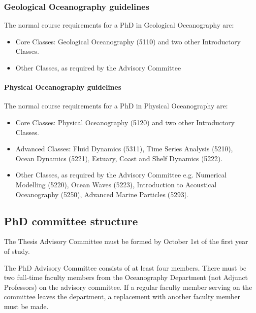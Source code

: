 \documentclass{article}
\begin{document}
\subsubsection{Geological Oceanography guidelines}

The normal course requirements for a PhD in Geological Oceanography are:

\begin{itemize}
\item Core Classes: Geological Oceanography (5110) and two other Introductory Classes.
\item Other Classes, as required by the Advisory Committee
\end{itemize}

\paragraph{Physical Oceanography guidelines}

The normal course requirements for a PhD in Physical Oceanography are:

\begin{itemize}
\item Core Classes: Physical Oceanography (5120) and two other Introductory Classes.
\item Advanced Classes: Fluid Dynamics (5311), Time Series Analysis (5210),
Ocean Dynamics (5221), Estuary, Coast and Shelf Dynamics (5222).
\item Other Classes, as required by the Advisory Committee e.g. Numerical
Modelling (5220), Ocean Waves (5223), Introduction to Acoustical Oceanography
(5250), Advanced Marine Particles (5293).
\end{itemize}

\subsection{PhD committee structure}

The Thesis Advisory Committee must be formed by October 1st of the first year
of study.

The PhD Advisory Committee consists of at least four members. There must be two
full-time faculty members from the Oceanography Department (not Adjunct
Professors) on the advisory committee. If a regular faculty member serving on
the committee leaves the department, a replacement with another faculty member
must be made.
\end{document}
